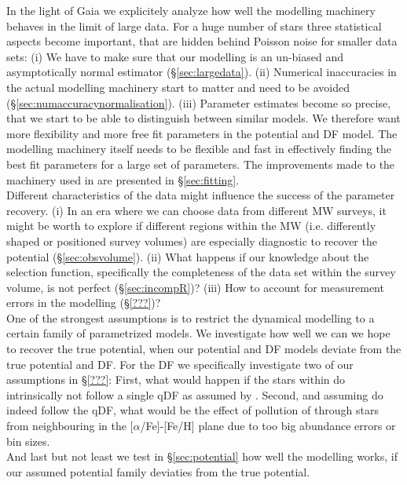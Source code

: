 In the light of Gaia we explicitely analyze how well the modelling machinery behaves in the limit of large data. For a huge number of stars three statistical aspects become important, that are  hidden behind Poisson noise for smaller data sets: (i) We have to make sure that our modelling is an un-biased and asymptotically normal estimator (\S\ref{sec:largedata}). (ii) Numerical inaccuracies in the actual modelling machinery start to matter and need to be avoided (\S\ref{sec:numaccuracynormalisation}). (iii) Parameter estimates become so precise, that we start to be able to distinguish between similar models. We therefore want more flexibility and more free fit parameters in the potential and DF model. The modelling machinery itself needs to be flexible and fast in effectively finding the best fit parameters for a large set of parameters. The improvements made to the machinery used in \cite{bov13} are presented in \S\ref{sec:fitting}. \\

Different characteristics of the data might influence the success of the parameter recovery. (i) In an era where we can choose data from different MW surveys, it might be worth to explore if different regions within the MW (i.e. differently shaped or positioned survey volumes) are especially diagnostic to recover the potential (\S\ref{sec:obsvolume}). (ii) What happens if our knowledge about the selection function, specifically the completeness of the data set within the survey volume, is not perfect (\S\ref{sec:incompR})? (iii) How to account for measurement errors in the modelling (\S\ref{???})? \\

One of the strongest assumptions is to restrict the dynamical modelling to a certain family of parametrized models. We investigate how well we can we hope to recover the true potential, when our potential and DF models deviate from the true potential and DF. For the DF we specifically investigate two of our assumptions in \S\ref{???}: First, what would happen if the stars within \MAPs do intrinsically not follow a single qDF as assumed by \cite{tin13,bov13}. Second, and assuming \MAPs do indeed follow the qDF, what would be the effect of pollution of \MAPs through stars from neighbouring \MAPs in the [$\alpha$/Fe]-[Fe/H] plane due to too big abundance errors or bin sizes.\\
And last but not least we test in \S\ref{sec:potential} how well the modelling works, if our assumed potential family deviaties from the true potential. \\

